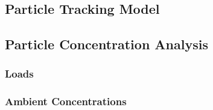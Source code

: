 \documentclass[draft]{jgr/agujournal2019}
\begin{document}
\subsection{Particle Tracking Model}

\subsection{Particle Concentration Analysis}

\subsubsection{Loads}

\subsubsection{Ambient Concentrations}






%
%
%
%
%
%
%
%
%
%
\end{document}

